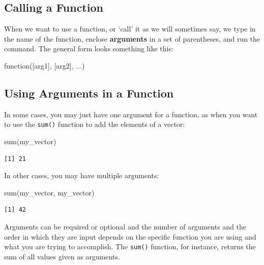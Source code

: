 \documentclass[
  letterpaper,
]{book}
\newenvironment{Shaded}{\begin{snugshade}}{\end{snugshade}}
\newcommand{\ControlFlowTok}[1]{\textcolor[rgb]{0.00,0.23,0.31}{#1}}
\newcommand{\FunctionTok}[1]{\textcolor[rgb]{0.28,0.35,0.67}{#1}}
\newcommand{\NormalTok}[1]{\textcolor[rgb]{0.00,0.23,0.31}{#1}}
\begin{document}
\hypertarget{calling-a-function}{%
\subsection{Calling a Function}\label{calling-a-function}}

When we want to use a function, or `call' it as we will sometimes say,
we type in the name of the function, enclose \textbf{arguments} in a set
of parentheses, and run the command. The general form looks something
like this:

\begin{Shaded}
\begin{Highlighting}[]
\ControlFlowTok{function}\NormalTok{([arg1], [arg2], ...)}
\end{Highlighting}
\end{Shaded}

\hypertarget{using-arguments-in-a-function}{%
\subsection{Using Arguments in a
Function}\label{using-arguments-in-a-function}}

In some cases, you may just have one argument for a function, as when
you want to use the \texttt{sum()} function to add the elements of a
vector:

\begin{Shaded}
\begin{Highlighting}[]
\FunctionTok{sum}\NormalTok{(my\_vector)}
\end{Highlighting}
\end{Shaded}

\begin{verbatim}
[1] 21
\end{verbatim}

In other cases, you may have multiple arguments:

\begin{Shaded}
\begin{Highlighting}[]
\FunctionTok{sum}\NormalTok{(my\_vector, my\_vector)}
\end{Highlighting}
\end{Shaded}

\begin{verbatim}
[1] 42
\end{verbatim}

Arguments can be required or optional and the number of arguments and
the order in which they are input depends on the specific function you
are using and what you are trying to accomplish. The \texttt{sum()}
function, for instance, returns the sum of all values given as
arguments.
\end{document}
